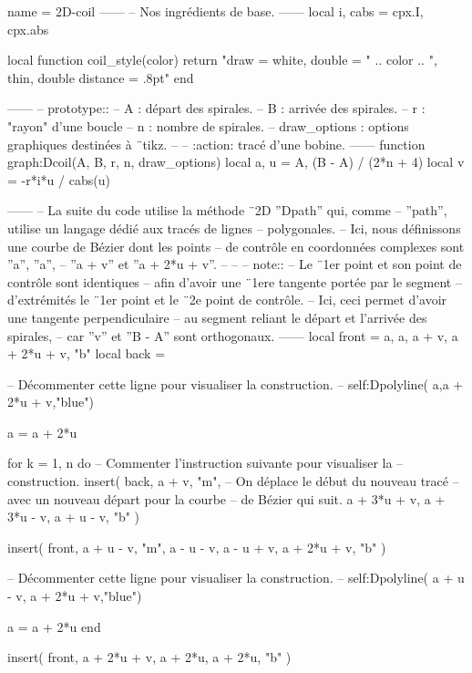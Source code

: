 \documentclass[varwidth]{standalone}
\begin{document}
\begin{luadraw}{name = 2D-coil}
------
-- Nos ingrédients de base.
------
local i, cabs = cpx.I, cpx.abs

local function coil_style(color)
  return "draw = white, double = " .. color
      .. ", thin, double distance = .8pt"
end

------
-- prototype::
--     A            : départ des spirales.
--     B            : arrivée des spirales.
--     r            : "rayon" d'une boucle
--     n            : nombre de spirales.
--     draw_options : options graphiques destinées à ¨tikz.
--
--     :action: tracé d'une bobine.
------
function graph:Dcoil(A, B, r, n, draw_options)
  local a, u = A, (B - A) / (2*n + 4)
  local v    = -r*i*u / cabs(u)

------
-- La suite du code utilise la méthode ¨2D ''Dpath'' qui, comme
-- ''path'', utilise un langage dédié aux tracés de lignes
-- polygonales.
-- Ici, nous définissons une courbe de Bézier dont les points
-- de contrôle en coordonnées complexes sont ''a'', ''a'',
-- ''a + v'' et ''a + 2*u + v''.
--
--
-- note::
--     Le ¨1er point et son point de contrôle sont identiques
--     afin d'avoir une ¨1ere tangente portée par le segment
--     d'extrémités le ¨1er point et le ¨2e point de contrôle.
--     Ici, ceci permet d'avoir une tangente perpendiculaire
--     au segment reliant le départ et l'arrivée des spirales,
--     car ''v'' et ''B - A'' sont orthogonaux.
------
  local front = {a, a, a + v, a + 2*u + v, "b"}
  local back  = {}

-- Décommenter cette ligne pour visualiser la construction.
--  self:Dpolyline( {a,a + 2*u + v},"blue")

  a = a + 2*u

  for k = 1, n do
-- Commenter l'instruction suivante pour visualiser la
-- construction.
    insert(
      back,
      {
        a + v, "m", -- On déplace le début du nouveau tracé
                    -- avec un nouveau départ pour la courbe
                    -- de Bézier qui suit.
        a + 3*u + v, a + 3*u - v, a + u - v, "b"
      }
    )

    insert(
      front,
      {
        a + u - v, "m",
        a - u - v, a - u + v, a + 2*u + v, "b"
      }
    )

-- Décommenter cette ligne pour visualiser la construction.
--    self:Dpolyline( {a + u - v, a + 2*u + v},"blue")

    a = a + 2*u
  end

  insert(
    front,
    {a + 2*u + v, a + 2*u, a + 2*u, "b"}
  )


\end{luadraw}
\end{document}
